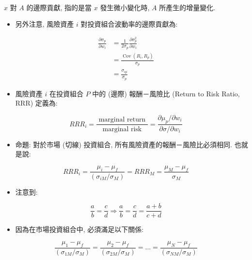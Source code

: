 \documentclass[letterpaper]{article}
\begin{document}
		$x$ 對 $A$ 的邊際貢獻, 指的是當 $x$ 發生微小變化時, $A$ 所產生的增量變化.
		
		
		\begin{itemize}
			\item 另外注意, 風險資產 $i$ 對投資組合波動率的邊際貢獻為: 
		\end{itemize}
		
		$$
		\begin{aligned}
			\frac{\partial \sigma_{p}}{\partial w_{i}} & =\frac{1}{2 \sigma_{p}} \frac{\partial \sigma_{p}^{2}}{\partial w_{i}} \\
			& =\frac{\operatorname{Cov}\left (R_{i}, R_{p}\right) }{\sigma_{p}} \\
			& =\frac{\sigma_{i p}}{\sigma_{p}}
		\end{aligned}
		$$
		
		\begin{itemize}
			\item 風險資產 $i$ 在投資組合 $P$ 中的 (邊際) 報酬－風險比 (Return to Risk Ratio, RRR) 定義為: 
		\end{itemize}
		
		$$
		R R R_{i}=\frac{\text { marginal return }}{\text { marginal risk }}=\frac{\partial \mu_{p} / \partial w_{i}}{\partial \sigma / \partial w_{i}}
		$$
		
		
		\begin{itemize}
			\item 命題: 對於市場 (切線) 投資組合, 所有風險資產的報酬－風險比必須相同. 也就是說: 
		\end{itemize}
		
		
		$$
		R R R_{i}=\frac{\mu_{i}-\mu_{f}}{\left (\sigma_{i M} / \sigma_{M}\right) }=R R R_{M}=\frac{\mu_{M}-\mu_{f}}{\sigma_{M}}
		$$
		
		\begin{itemize}
			\item 注意到: 
		\end{itemize}
		
		$$
		\frac{a}{b}=\frac{c}{d} \Longrightarrow \frac{a}{b}=\frac{c}{d}=\frac{a+b}{c+d}
		$$
		
		\begin{itemize}
			\item 因為在市場投資組合中, 必須滿足以下關係: 
		\end{itemize}
		
		$$
		\frac{\mu_{1}-\mu_{f}}{\left (\sigma_{1 M} / \sigma_{M}\right) }=\frac{\mu_{2}-\mu_{f}}{\left (\sigma_{2 M} / \sigma_{M}\right) }=\ldots=\frac{\mu_{N}-\mu_{f}}{\left (\sigma_{N M} / \sigma_{M}\right) }
		$$
		
\end{document}
